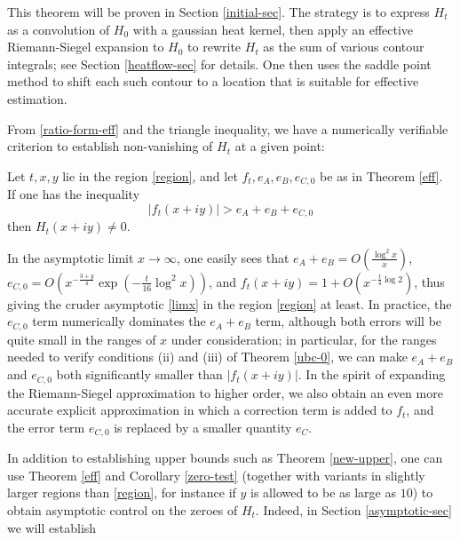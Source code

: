 This theorem will be proven in Section \ref{initial-sec}.  The strategy is to express $H_t$ as a convolution of $H_0$ with a gaussian heat kernel, then apply an effective Riemann-Siegel expansion to $H_0$ to rewrite $H_t$ as the sum of various contour integrals; see Section \ref{heatflow-sec} for details.  One then uses the saddle point method to shift each such contour to a location that is suitable for effective estimation. 

From \eqref{ratio-form-eff} and the triangle inequality, we have a numerically verifiable criterion to establish non-vanishing of $H_t$ at a given point:

\begin{corollary}\label{zero-test}  Let $t,x,y$ lie in the region \eqref{region}, and let $f_t, e_A, e_B, e_{C,0}$ be as in Theorem \ref{eff}.  If one has the inequality
\begin{equation}\label{criterion}
|f_t(x+iy)| > e_A + e_B + e_{C,0} 
\end{equation}
then $H_t(x+iy) \neq 0$.
\end{corollary}


In the asymptotic limit $x \to \infty$, one easily sees that $e_A+e_B = O( \frac{\log^2 x}{x} )$, $e_{C,0} = O( x^{-\frac{3+y}{4}} \exp(-\frac{t}{16} \log^2 x ) )$, and $f_t(x+iy) = 1 + O( x^{-\frac{t}{4}\log 2} )$, thus giving the cruder asymptotic \eqref{limx} in the region \eqref{region} at least.   In practice, the $e_{C,0}$ term numerically dominates the $e_A+e_B$ term, although both errors will be quite small in the ranges of $x$ under consideration; in particular, for the ranges needed to verify conditions (ii) and (iii) of Theorem \ref{ubc-0}, we can make $e_A+e_B$ and $e_{C,0}$ both significantly smaller than $|f_t(x+iy)|$.  In the spirit of expanding the Riemann-Siegel approximation to higher order, we also obtain an even more accurate explicit approximation in which a correction term is added to $f_t$, and the error term $e_{C,0}$ is replaced by a smaller quantity $e_C$.

In addition to establishing upper bounds such as Theorem \ref{new-upper}, one can use Theorem \ref{eff} and Corollary \ref{zero-test} (together with variants in slightly larger regions than \eqref{region}, for instance if $y$ is allowed to be as large as $10$) to obtain asymptotic control on the zeroes of $H_t$.  Indeed, in Section \ref{asymptotic-sec} we will establish

